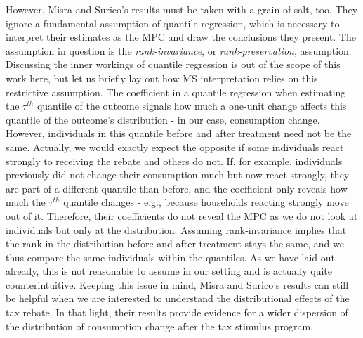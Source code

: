 However, Misra and Surico's results must be taken with a grain of salt, too. They ignore a fundamental assumption of quantile regression, which is necessary to interpret their estimates as the MPC and draw the conclusions they present. The assumption in question is the \textit{rank-invariance}, or \textit{rank-preservation}, assumption. Discussing the inner workings of quantile regression is out of the scope of this work here, but let us briefly lay out how MS interpretation relies on this restrictive assumption. The coefficient in a quantile regression when estimating the $\tau^{th}$ quantile of the outcome signals how much a one-unit change affects this quantile of the outcome's distribution - in our case, consumption change. However, individuals in this quantile before and after treatment need not be the same. Actually, we would exactly expect the opposite if some individuals react strongly to receiving the rebate and others do not. If, for example, individuals previously did not change their consumption much but now react strongly, they are part of a different quantile than before, and the coefficient only reveals how much the $\tau^{th}$ quantile changes - e.g., because households reacting strongly move out of it. Therefore, their coefficients do not reveal the MPC as we do not look at individuals but only at the distribution. Assuming rank-invariance implies that the rank in the distribution before and after treatment stays the same, and we thus compare the same individuals within the quantiles. As we have laid out already, this is not reasonable to assume in our setting and is actually quite counterintuitive. Keeping this issue in mind, Misra and Surico's results can still be helpful when we are interested to understand the distributional effects of the tax rebate. In that light, their results provide evidence for a wider dispersion of the distribution of consumption change after the tax stimulus program.